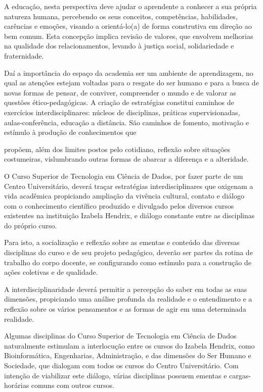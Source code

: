 \documentclass[a4paper, 12pt, openright, oneside, german, french, english, brazil]{abntex2}
\begin{document}
A educação, nesta perspectiva deve ajudar o aprendente a conhecer a sua própria natureza humana, percebendo os seus conceitos, competências, habilidades, carências e emoções, visando a orientá-lo(a) de forma construtiva em direção ao bem comum. Esta concepção implica revisão de valores, que envolvem melhorias na qualidade dos relacionamentos, levando à justiça social, solidariedade e fraternidade.

Daí a importância do espaço da academia ser um ambiente de aprendizagem, no qual as atenções estejam voltadas para o resgate do ser humano e para a busca de novas formas de pensar, de conviver, compreender o mundo e de valorar as questões ético-pedagógicas. A criação de estratégias constitui caminhos de exercícios interdisciplinares: núcleos de disciplinas, práticas supervisionadas, aulas-conferência, educação a distância. São caminhos de fomento, motivação e estímulo à produção de conhecimentos que

propõem, além dos limites postos pelo cotidiano, reflexão sobre situações costumeiras, vislumbrando outras formas de abarcar a diferença e a alteridade.

O Curso Superior de Tecnologia em Ciência de Dados, por fazer parte de um Centro Universitário, deverá traçar estratégias interdisciplinares que oxigenam a vida acadêmica propiciando ampliação da vivência cultural, contato e diálogo com o conhecimento científico produzido e divulgado pelos diversos cursos existentes na instituição Izabela Hendrix, e diálogo constante entre as disciplinas do próprio curso.

Para isto, a socialização e reflexão sobre as ementas e conteúdo das diversas disciplinas do curso e de seu projeto pedagógico, deverão ser partes da rotina de trabalho do corpo docente, se configurando como estímulo para a construção de ações coletivas e de qualidade.

A interdisciplinaridade deverá permitir a percepção do saber em todas as suas dimensões, propiciando uma análise profunda da realidade e o entendimento e a reflexão sobre os vários pensamentos e as formas de agir em uma determinada realidade.

Algumas disciplinas do Curso Superior de Tecnologia em Ciência de Dados naturalmente estimulam a interlocução entre os cursos do Izabela Hendrix, como Bioinformática, Engenharias, Administração, e das dimensões do Ser Humano e Sociedade, que dialogam com todos os cursos do Centro Universitário. Com intenção de viabilizar este diálogo, várias disciplinas possuem ementas e cargas-horárias comuns com outros cursos.
\end{document}
